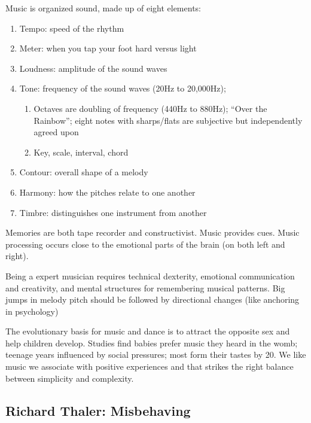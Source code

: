 \documentclass[
]{article}
\begin{document}
Music is organized sound, made up of eight elements:

\begin{enumerate}
\def\labelenumi{\arabic{enumi}.}
\item
  Tempo: speed of the rhythm
\item
  Meter: when you tap your foot hard versus light
\item
  Loudness: amplitude of the sound waves
\item
  Tone: frequency of the sound waves (20Hz to 20,000Hz);

  \begin{enumerate}
  \def\labelenumii{\arabic{enumii}.}
  \item
    Octaves are doubling of frequency (440Hz to 880Hz); ``Over the
    Rainbow''; eight notes with sharps/flats are subjective but
    independently agreed upon
  \item
    Key, scale, interval, chord
  \end{enumerate}
\item
  Contour: overall shape of a melody
\item
  Harmony: how the pitches relate to one another
\item
  Timbre: distinguishes one instrument from another
\end{enumerate}

Memories are both tape recorder and constructivist. Music provides cues.
Music processing occurs close to the emotional parts of the brain (on
both left and right).

Being a expert musician requires technical dexterity, emotional
communication and creativity, and mental structures for remembering
musical patterns. Big jumps in melody pitch should be followed by
directional changes (like anchoring in psychology)

The evolutionary basis for music and dance is to attract the opposite
sex and help children develop. Studies find babies prefer music they
heard in the womb; teenage years influenced by social pressures; most
form their tastes by 20. We like music we associate with positive
experiences and that strikes the right balance between simplicity and
complexity.

\hypertarget{richard-thaler-misbehaving}{%
\subsection{Richard Thaler:
Misbehaving}\label{richard-thaler-misbehaving}}
\end{document}
